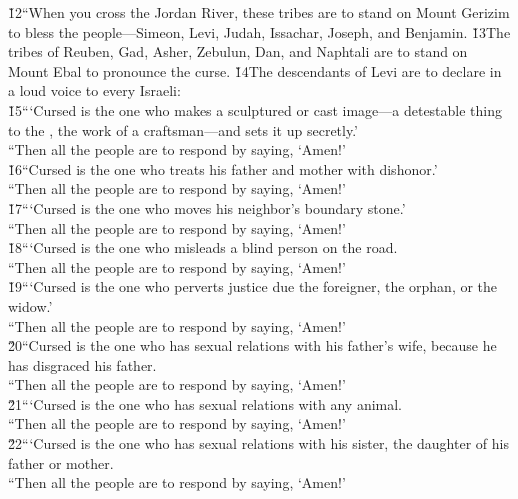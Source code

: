 \begin{poetry}
\poeml \v{12}``When you cross the Jordan River, these tribes are to stand on Mount Gerizim to bless the people---Simeon, Levi, Judah, Issachar, Joseph, and Benjamin. \v{13}The tribes of Reuben, Gad, Asher, Zebulun, Dan, and Naphtali are to stand on Mount Ebal to pronounce the curse. \v{14}The descendants of Levi are to declare in a loud voice to every Israeli: \\
\poeml \v{15}```Cursed is the one who makes a sculptured or cast image---a detestable thing to the , the work of a craftsman---and sets it up secretly.' \\
\poeml ``Then all the people are to respond by saying, `Amen!' \\
\poeml \v{16}``Cursed is the one who treats his father and mother with dishonor.' \\
\poeml ``Then all the people are to respond by saying, `Amen!' \\
\poeml \v{17}```Cursed is the one who moves his neighbor's boundary stone.' \\
\poeml ``Then all the people are to respond by saying, `Amen!' \\
\poeml \v{18}```Cursed is the one who misleads a blind person on the road. \\
\poeml ``Then all the people are to respond by saying, `Amen!' \\
\poeml \v{19}```Cursed is the one who perverts justice due the foreigner, the orphan, or the widow.' \\
\poeml ``Then all the people are to respond by saying, `Amen!' \\
\poeml \v{20}``Cursed is the one who has sexual relations with his father's wife, because he has disgraced his father. \\
\poeml ``Then all the people are to respond by saying, `Amen!' \\
\poeml \v{21}```Cursed is the one who has sexual relations with any animal. \\
\poeml ``Then all the people are to respond by saying, `Amen!' \\
\poeml \v{22}```Cursed is the one who has sexual relations with his sister, the daughter of his father or mother. \\
\poeml ``Then all the people are to respond by saying, `Amen!' \\

\end{poetry}
